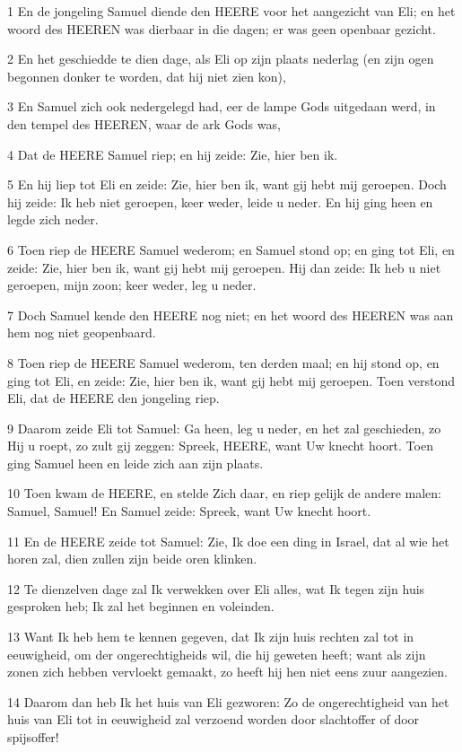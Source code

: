 \par 1 En de jongeling Samuel diende den HEERE voor het aangezicht van Eli; en het woord des HEEREN was dierbaar in die dagen; er was geen openbaar gezicht.
\par 2 En het geschiedde te dien dage, als Eli op zijn plaats nederlag (en zijn ogen begonnen donker te worden, dat hij niet zien kon),
\par 3 En Samuel zich ook nedergelegd had, eer de lampe Gods uitgedaan werd, in den tempel des HEEREN, waar de ark Gods was,
\par 4 Dat de HEERE Samuel riep; en hij zeide: Zie, hier ben ik.
\par 5 En hij liep tot Eli en zeide: Zie, hier ben ik, want gij hebt mij geroepen. Doch hij zeide: Ik heb niet geroepen, keer weder, leide u neder. En hij ging heen en legde zich neder.
\par 6 Toen riep de HEERE Samuel wederom; en Samuel stond op; en ging tot Eli, en zeide: Zie, hier ben ik, want gij hebt mij geroepen. Hij dan zeide: Ik heb u niet geroepen, mijn zoon; keer weder, leg u neder.
\par 7 Doch Samuel kende den HEERE nog niet; en het woord des HEEREN was aan hem nog niet geopenbaard.
\par 8 Toen riep de HEERE Samuel wederom, ten derden maal; en hij stond op, en ging tot Eli, en zeide: Zie, hier ben ik, want gij hebt mij geroepen. Toen verstond Eli, dat de HEERE den jongeling riep.
\par 9 Daarom zeide Eli tot Samuel: Ga heen, leg u neder, en het zal geschieden, zo Hij u roept, zo zult gij zeggen: Spreek, HEERE, want Uw knecht hoort. Toen ging Samuel heen en leide zich aan zijn plaats.
\par 10 Toen kwam de HEERE, en stelde Zich daar, en riep gelijk de andere malen: Samuel, Samuel! En Samuel zeide: Spreek, want Uw knecht hoort.
\par 11 En de HEERE zeide tot Samuel: Zie, Ik doe een ding in Israel, dat al wie het horen zal, dien zullen zijn beide oren klinken.
\par 12 Te dienzelven dage zal Ik verwekken over Eli alles, wat Ik tegen zijn huis gesproken heb; Ik zal het beginnen en voleinden.
\par 13 Want Ik heb hem te kennen gegeven, dat Ik zijn huis rechten zal tot in eeuwigheid, om der ongerechtigheids wil, die hij geweten heeft; want als zijn zonen zich hebben vervloekt gemaakt, zo heeft hij hen niet eens zuur aangezien.
\par 14 Daarom dan heb Ik het huis van Eli gezworen: Zo de ongerechtigheid van het huis van Eli tot in eeuwigheid zal verzoend worden door slachtoffer of door spijsoffer!
